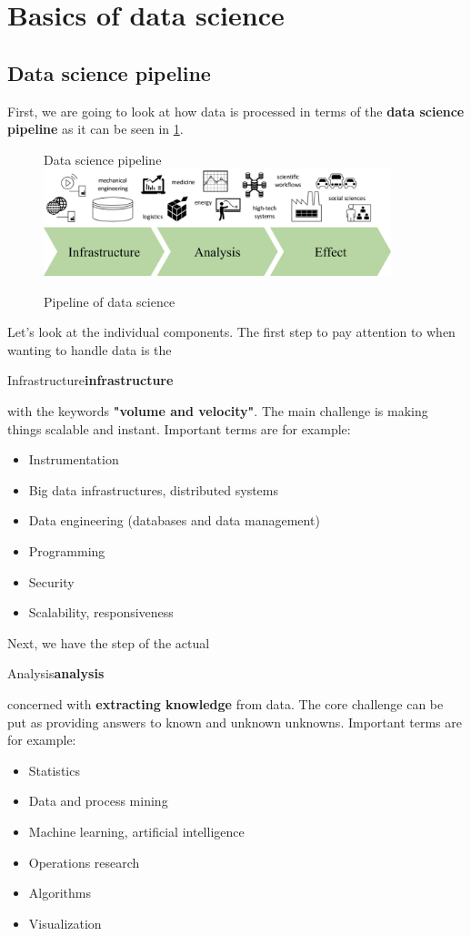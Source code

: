 \section{Basics of data science}
\setcounter{figure}{0}

\subsection{Data science pipeline}
First, we are going to look at how data is processed in terms of the \textbf{data science pipeline} as it can be seen in \ref{fig:1_pipeline}. 

\begin{figure}[H]
  \centering
  \begin{sidenote}{Data science pipeline}\includegraphics[width=0.9\textwidth]{assets/basics/pipeline.png}\end{sidenote}
  \caption{Pipeline of data science}
  \label{fig:1_pipeline}
\end{figure}

Let's look at the individual components. The first step to pay attention to when wanting to handle data is the \begin{sidenote}{Infrastructure}\textbf{infrastructure}\end{sidenote} with the keywords \textbf{"volume and velocity"}. The main challenge is making things scalable and instant. Important terms are for example:
\begin{itemize}
  \item Instrumentation
  \item Big data infrastructures, distributed systems
  \item Data engineering (databases and data management)
  \item Programming
  \item Security
  \item Scalability, responsiveness
\end{itemize}

Next, we have the step of the actual \begin{sidenote}{Analysis}\textbf{analysis}\end{sidenote} concerned with \textbf{extracting knowledge} from data. The core challenge can be put as providing answers to known and unknown unknowns. Important terms are for example:
\begin{itemize}
  \item Statistics
  \item Data and process mining
  \item Machine learning, artificial intelligence
  \item Operations research
  \item Algorithms
  \item Visualization
\end{itemize}

